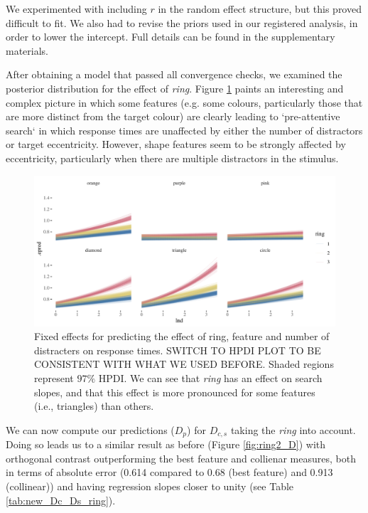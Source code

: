 \documentclass[preprint,12pt,authoryear]{elsarticle}
\begin{document}
We experimented with including $r$ in the random effect structure, but this proved difficult to fit. We also had to revise the priors used in our registered analysis, in order to lower the intercept. Full details can be found in the supplementary materials. 

After obtaining a model that passed all convergence checks, we examined the posterior distribution for the effect of \textit{ring}. Figure \ref{fig:ring1} paints an interesting and complex picture in which some features (e.g. some colours, particularly those that are more distinct from the target colour) are clearly leading to `pre-attentive search` in which response times are unaffected by either the number of distractors or target eccentricity. However, shape features seem to be strongly affected by eccentricity, particularly when there are multiple distractors in the stimulus.

\begin{figure}[ht]
\centering
\includegraphics[width=\textwidth]{../plots/ring_single_feature.pdf}
\caption{Fixed effects for predicting the effect of ring, feature and number of distracters on response times. SWITCH TO HPDI PLOT TO BE CONSISTENT WITH WHAT WE USED BEFORE. Shaded regions represent $97\%$ HPDI. We can see that \textit{ring} has an effect on search slopes, and that this effect is more pronounced for some features (i.e., triangles) than others.}
\label{fig:ring1}
\end{figure}

We can now compute our predictions ($D_p$) for $D_{c,s}$ taking the \textit{ring} into account. Doing so leads us to a similar result as before (Figure \ref{fig:ring2_D}) with orthogonal contrast outperforming the best feature and collienar measures, both in terms of absolute error (0.614 compared to 0.68 (best feature) and 0.913 (collinear)) and having regression slopes closer to unity (see Table \ref{tab:new_Dc_Ds_ring}).
\end{document}
